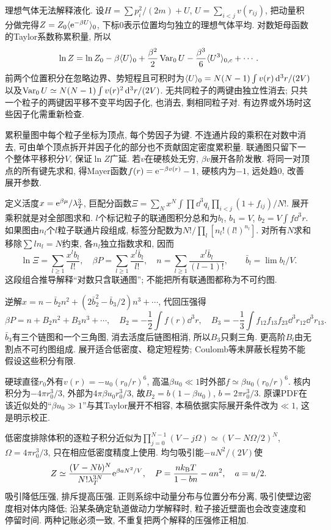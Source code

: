 \label{ch:interactions}
理想气体无法解释液化. 设$H=\sum p_i^2/(2m)+U$, $U=\sum_{i<j}v(r_{ij})$, 把动量积分做完得$Z=Z_0\langle \mathrm e^{-\beta U}\rangle_0$, 下标0表示位置均匀独立的理想气体平均. 对数矩母函数的Taylor系数称累积量, 所以
\[
\ln Z=\ln Z_0-\beta\langle U\rangle_0+\frac{\beta^2}2\operatorname{Var}_0U-\frac{\beta^3}{6}\langle U^3\rangle_{0,c}+\cdots.
\]
前两个位置积分在忽略边界、势短程且可积时为$\langle U\rangle_0=N(N-1)\int v(r)\,\mathrm d^3r/(2V)$以及$\operatorname{Var}_0U\simeq N(N-1)\int v(r)^2\,\mathrm d^3r/(2V)$. 无共同粒子的两键由独立性消去; 只共一个粒子的两键因平移不变平均因子化, 也消去, 剩相同粒子对. 有边界或外场时这些因子化需重新检查.

累积量图中每个粒子坐标为顶点, 每个势因子为键. 不连通片段的乘积在对数中消去, 可由单个顶点拆开并因子化的部分也不贡献固定密度累积量. 联通图只留下一个整体平移积分$V$, 保证$\ln Z$广延. 若$v$在硬核处无穷, $\beta v$展开各阶发散. 将同一对顶点的所有键先求和, 得Mayer函数$f(r)=\mathrm e^{-\beta v(r)}-1$, 硬核内为$-1$, 远处趋0, 改善展开参数.

定义活度$x=\mathrm e^{\beta\mu}/\lambda_T^3$, 巨配分函数$\Xi=\sum_Nx^N\int\prod\dd^3q_i\prod_{i<j}(1+f_{ij})/N!$. 展开乘积就是对全部图求和. $l$个标记粒子的联通图积分总和为$b_l$, $b_1=V$, $b_2=V\int f\dd^3r$. 如果图由$n_l$个$l$粒子联通片段组成, 标签分配数为$N!/\prod_l[n_l!(l!)^{n_l}]$. 对所有$N$求和移除$\sum ln_l=N$约束, 各$n_l$独立指数求和, 因而
\[
\ln\Xi=\sum_{l\ge1}\frac{x^lb_l}{l!},\quad
\beta P=\sum_{l\ge1}\frac{x^l\bar b_l}{l!},\quad
n=\sum_{l\ge1}\frac{x^l\bar b_l}{(l-1)!},\qquad\bar b_l=\lim b_l/V.
\]
这段组合推导解释“对数只含联通图”; 不能把所有联通图都称为不可约图.

逆解$x=n-\bar b_2n^2+(2\bar b_2^2-\bar b_3/2)n^3+\cdots$, 代回压强得
\[
\beta P=n+B_2n^2+B_3n^3+\cdots,\quad
B_2=-\frac12\int f(r)\dd^3r,\quad
B_3=-\frac13\int f_{12}f_{13}f_{23}\dd^3r_{12}\dd^3r_{13}.
\]
$\bar b_3$有三个链图和一个三角图, 消去活度后链图相消, 所以$B_3$只剩三角. 更高阶$B_l$由无割点不可约图组成. 展开适合低密度、稳定短程势; Coulomb等未屏蔽长程势不能假设这些积分有限.

硬球直径$r_0$外有$v(r)=-u_0(r_0/r)^6$, 高温\textbf{$\beta u_0\ll1$}时外部$f\simeq\beta u_0(r_0/r)^6$. 核内积分为$-4\pi r_0^3/3$, 外部为$4\pi\beta u_0r_0^3/3$, 故$B_2=b(1-\beta u_0)$, $b=2\pi r_0^3/3$. 原课PDF在该近似处的“$\beta u_0\gg1$”与其Taylor展开不相容, 本稿依据实际展开条件改为$\ll1$, 这是明示校正.

低密度排除体积的逐粒子积分近似为$\prod_{j=0}^{N-1}(V-j\Omega)\simeq(V-N\Omega/2)^N$, $\Omega=4\pi r_0^3/3$, 只在相应低密度精度上使用. 均匀吸引能$-uN^2/(2V)$使
\[
Z\simeq\frac{(V-Nb)^N}{N!\lambda_T^{3N}}\mathrm e^{\beta aN^2/V},
\quad P=\frac{nk_{\mathrm B} T}{1-bn}-an^2,\quad a=u/2.
\]
吸引降低压强, 排斥提高压强. 正则系综中动量分布与位置分布分离, 吸引使壁边密度相对体内降低; 沿某条确定轨道做动力学解释时, 粒子接近壁面也会改变速度和停留时间. 两种记账必须一致, 不重复把两个解释的压强修正相加.

